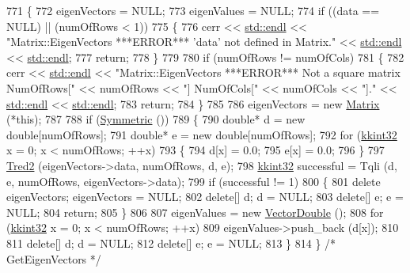 \begin{DoxyCode}
771 \{
772   eigenVectors = NULL;
773   eigenValues  = NULL;
774   \textcolor{keywordflow}{if}  ((data == NULL)  ||  (numOfRows < 1))
775   \{
776     cerr << \hyperlink{namespace_k_k_b_ad1f50f65af6adc8fa9e6f62d007818a8}{std::endl} << \textcolor{stringliteral}{"Matrix::EigenVectors   ***ERROR***   'data' not defined in Matrix."} << 
      \hyperlink{namespace_k_k_b_ad1f50f65af6adc8fa9e6f62d007818a8}{std::endl} << \hyperlink{namespace_k_k_b_ad1f50f65af6adc8fa9e6f62d007818a8}{std::endl};
777     \textcolor{keywordflow}{return};
778   \}
779   
780   \textcolor{keywordflow}{if}  (numOfRows != numOfCols)
781   \{
782     cerr << \hyperlink{namespace_k_k_b_ad1f50f65af6adc8fa9e6f62d007818a8}{std::endl} << \textcolor{stringliteral}{"Matrix::EigenVectors   ***ERROR***   Not a square matrix  NumOfRows["} <<
       numOfRows << \textcolor{stringliteral}{"]  NumOfCols["} << numOfCols << \textcolor{stringliteral}{"]."} << \hyperlink{namespace_k_k_b_ad1f50f65af6adc8fa9e6f62d007818a8}{std::endl} << 
      \hyperlink{namespace_k_k_b_ad1f50f65af6adc8fa9e6f62d007818a8}{std::endl};
783     \textcolor{keywordflow}{return};
784   \}
785 
786   eigenVectors = \textcolor{keyword}{new} \hyperlink{class_k_k_b_1_1_matrix_a2dba13c45127354c9f75ef576f49269b}{Matrix} (*\textcolor{keyword}{this});
787 
788   \textcolor{keywordflow}{if}  (\hyperlink{class_k_k_b_1_1_matrix_a68ce1e9491bb1c1a69ce16bbd12bb6db}{Symmetric} ())
789   \{
790     \textcolor{keywordtype}{double}*  d = \textcolor{keyword}{new} \textcolor{keywordtype}{double}[numOfRows];
791     \textcolor{keywordtype}{double}*  e = \textcolor{keyword}{new} \textcolor{keywordtype}{double}[numOfRows];
792     \textcolor{keywordflow}{for}  (\hyperlink{namespace_k_k_b_a8fa4952cc84fda1de4bec1fbdd8d5b1b}{kkint32} x = 0;  x < numOfRows;  ++x)
793     \{
794       d[x] = 0.0;
795       e[x] = 0.0;
796     \}
797     \hyperlink{namespace_k_k_b_a2a2800ef0c9757025d696bcd2fb289b8}{Tred2} (eigenVectors->data, numOfRows, d, e);
798     \hyperlink{namespace_k_k_b_a8fa4952cc84fda1de4bec1fbdd8d5b1b}{kkint32}  successful = Tqli (d, e, numOfRows, eigenVectors->data);
799     \textcolor{keywordflow}{if}  (successful != 1)
800     \{
801       \textcolor{keyword}{delete}  eigenVectors;  eigenVectors = NULL;
802       \textcolor{keyword}{delete}[] d;            d = NULL;
803       \textcolor{keyword}{delete}[] e;            e = NULL;
804       \textcolor{keywordflow}{return};
805     \}
806 
807     eigenValues = \textcolor{keyword}{new} \hyperlink{namespace_k_k_b_a5906c207479607e5f450434095914a41}{VectorDouble} ();
808     \textcolor{keywordflow}{for}  (\hyperlink{namespace_k_k_b_a8fa4952cc84fda1de4bec1fbdd8d5b1b}{kkint32} x = 0;  x < numOfRows;  ++x)
809       eigenValues->push\_back (d[x]);
810 
811     \textcolor{keyword}{delete}[]  d;  d = NULL;
812     \textcolor{keyword}{delete}[]  e;  e = NULL;
813   \}
814 \}  \textcolor{comment}{/* GetEigenVectors */}
\end{DoxyCode}
